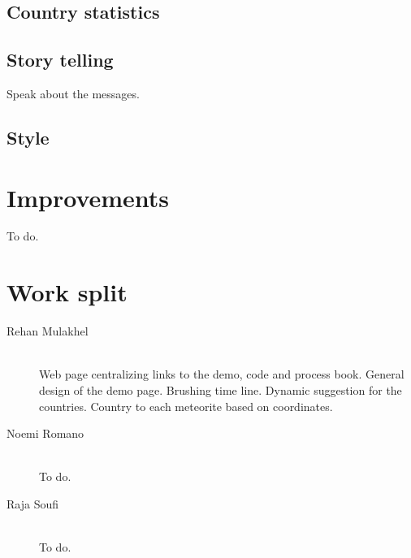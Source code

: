 \documentclass[10pt,conference,compsocconf]{IEEEtran}
\begin{document}
\subsection{Country statistics}


\subsection{Story telling}
Speak about the messages. 

\subsection{Style}







\section{Improvements}
\label{sec:improvements}

To do.

\section{Work split}
\label{sec:work_split}

\begin{description}
\item[Rehan Mulakhel] \ \\
  Web page centralizing links to the demo, code and process book. General design of the demo page. Brushing time line. Dynamic suggestion for the countries. Country to each meteorite based on coordinates. 
\item[Noemi Romano] \ \\
  To do.
\item[Raja Soufi] \ \\
  To do.
\end{description}






\end{document}
